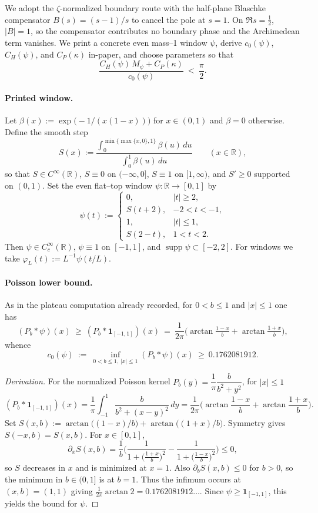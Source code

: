 \documentclass[11pt]{article}
\theoremstyle{definition}
\theoremstyle{remark}
\newcommand{\R}{\mathbb{R}}
\newcommand{\Poisson}{P}
\begin{document}
 
We adopt the \(\zeta\)-normalized boundary route with the half-plane Blaschke compensator \(B(s)=(s-1)/s\) to cancel the pole at \(s=1\). On \(\Re s=\tfrac12\), \(|B|=1\), so the compensator contributes no boundary phase and the Archimedean term vanishes. We print a concrete even mass--1 window \(\psi\), derive \(c_0(\psi)\), \(C_H(\psi)\), and \(C_P(\kappa)\) in-paper, and choose parameters so that
\[
  \frac{C_H(\psi)\,M_\psi + C_P(\kappa)}{c_0(\psi)}\ <\ \frac{\pi}{2}.
\]

\paragraph{Printed window.}
Let \(\beta(x):=\exp\!\big(-1/(x(1-x))\big)\) for \(x\in(0,1)\) and \(\beta=0\) otherwise. Define the smooth step
\[
  S(x):=\frac{\int_0^{\min\{\max\{x,0\},1\}} \beta(u)\,du}{\int_0^{1} \beta(u)\,du}\qquad (x\in\R),
\]
so that \(S\in C^\infty(\R)\), \(S\equiv 0\) on \(({-}\infty,0]\), \(S\equiv1\) on \([1,\infty)\), and \(S'\ge 0\) supported on \((0,1)\). Set the even flat--top window \(\psi:\R\to[0,1]\) by
\[
  \psi(t):=\begin{cases}
    0,& |t|\ge 2,\\
    S(t+2),& -2<t<-1,\\
    1,& |t|\le 1,\\
    S(2-t),& 1<t<2.
  \end{cases}
\]
Then \(\psi\in C_c^\infty(\R)\), \(\psi\equiv1\) on \([-1,1]\), and \(\operatorname{supp}\psi\subset[-2,2]\). For windows we take \(\varphi_L(t):=L^{-1}\psi(t/L)\).

\paragraph{Poisson lower bound.}
As in the plateau computation already recorded, for \(0<b\le 1\) and \(|x|\le 1\) one has
\[
 (\Poisson_b*\psi)(x)\ \ge\ (\Poisson_b*\mathbf 1_{[-1,1]})(x)
 \ =\ \frac{1}{2\pi}\Big(\arctan\tfrac{1-x}{b}+\arctan\tfrac{1+x}{b}\Big),
\]
whence
\[
 c_0(\psi)\ :=\ \inf_{0<b\le 1,\ |x|\le1}(\Poisson_b*\psi)(x)\ \ge\ 0.1762081912.
\]
\begin{proof}[Derivation]
For the normalized Poisson kernel \(P_b(y)=\dfrac{1}{\pi}\dfrac{b}{b^2+y^2}\), for \(|x|\le 1\)
\[
 (P_b*\mathbf 1_{[-1,1]})(x)=\frac{1}{\pi}\int_{-1}^{1}\frac{b}{b^2+(x-y)^2}\,dy=\frac{1}{2\pi}\Big(\arctan\frac{1-x}{b}+\arctan\frac{1+x}{b}\Big).
\]
Set \(S(x,b):=\arctan\big((1-x)/b\big)+\arctan\big((1+x)/b\big)\). Symmetry gives \(S(-x,b)=S(x,b)\). For \(x\in[0,1]\),
\[
 \partial_x S(x,b)=\frac{1}{b}\Big(\frac{1}{1+\big(\tfrac{1+x}{b}\big)^2}-\frac{1}{1+\big(\tfrac{1-x}{b}\big)^2}\Big)\le 0,
\]
so \(S\) decreases in \(x\) and is minimized at \(x=1\). Also \(\partial_b S(x,b)\le 0\) for \(b>0\), so the minimum in \(b\in(0,1]\) is at \(b=1\). Thus the infimum occurs at \((x,b)=(1,1)\) giving \(\frac{1}{2\pi}\arctan 2=0.1762081912\ldots\). Since \(\psi\ge \mathbf 1_{[-1,1]}\), this yields the bound for \(\psi\).
\end{proof}
\end{document}
